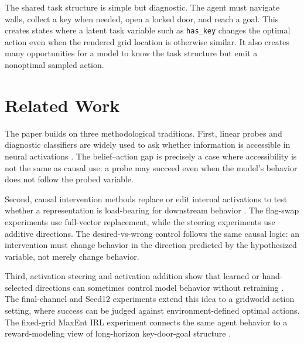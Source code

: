 \documentclass[11pt]{article}
\begin{document}
The shared task structure is simple but diagnostic.
The agent must navigate walls, collect a key when needed, open a locked door, and reach a goal.
This creates states where a latent task variable such as \texttt{has\_key} changes the optimal action even when the rendered grid location is otherwise similar.
It also creates many opportunities for a model to know the task structure but emit a nonoptimal sampled action.

\section{Related Work}

The paper builds on three methodological traditions.
First, linear probes and diagnostic classifiers are widely used to ask whether information is accessible in neural activations \cite{alain2016,belinkov2022,hewitt2019}.
The belief--action gap is precisely a case where accessibility is not the same as causal use: a probe may succeed even when the model's behavior does not follow the probed variable.

Second, causal intervention methods replace or edit internal activations to test whether a representation is load-bearing for downstream behavior \cite{meng2022,pearl2009}.
The flag-swap experiments use full-vector replacement, while the steering experiments use additive directions.
The desired-vs-wrong control follows the same causal logic: an intervention must change behavior in the direction predicted by the hypothesized variable, not merely change behavior.

Third, activation steering and activation addition show that learned or hand-selected directions can sometimes control model behavior without retraining \cite{turner2023}.
The final-channel and Seed12 experiments extend this idea to a gridworld action setting, where success can be judged against environment-defined optimal actions.
The fixed-grid MaxEnt IRL experiment connects the same agent behavior to a reward-modeling view of long-horizon key-door-goal structure \cite{ziebart2008}.
\end{document}
